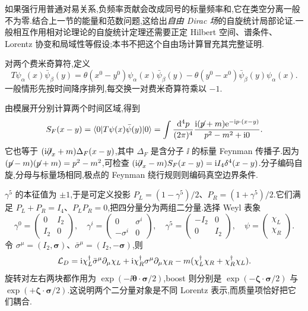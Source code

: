 如果强行用普通对易关系,负频率贡献会改成同号的标量频率和,它在类空分离一般不为零.结合上一节的能量和范数问题,这给出\emph{自由 Dirac 场}的自旋统计局部论证.一般相互作用相对论理论的自旋统计定理还需要正定 Hilbert 空间、谱条件、Lorentz 协变和局域性等假设;本书不把这个自由场计算冒充其完整证明.

\begin{definition}[费米时间排序]
对两个费米奇算符,定义
\begin{equation}
 T\psi_\alpha(x)\bar\psi_\beta(y)=
 \theta(x^0-y^0)\psi_\alpha(x)\bar\psi_\beta(y)
 -\theta(y^0-x^0)\bar\psi_\beta(y)\psi_\alpha(x).
\end{equation}
一般情形先按时间降序排列,每交换一对费米奇算符乘以 $-1$.
\end{definition}

由模展开分别计算两个时间区域,得到
\begin{equation}
 S_F(x-y)=\bra0T\psi(x)\bar\psi(y)\ket0
 =\intfourp\frac{\ii(\slashed p+m)\e^{-\ii p\cdot(x-y)}}{p^2-m^2+\ii0}.
 \label{eq:dirac-feynman}
\end{equation}
它也等于 $(\ii\slashed\partial_x+m)\Delta_F(x-y)$,其中 $\Delta_F$ 是含分子 $\ii$ 的标量 Feynman 传播子.因为 $(\slashed p-m)(\slashed p+m)=p^2-m^2$,可检查
$(\ii\slashed\partial_x-m)S_F(x-y)=\ii I_4\delta^4(x-y)$.分子编码自旋,分母与标量场相同,极点的 Feynman 绕行规则则编码真空边界条件.


$\gamma^5$ 的本征值为 $\pm1$,于是可定义投影 $P_L=(1-\gamma^5)/2$、$P_R=(1+\gamma^5)/2$.它们满足 $P_L+P_R=I_4$、$P_LP_R=0$,把四分量分为两组二分量.选择 Weyl 表象
\begin{equation}
 \gamma^0=\begin{pmatrix}0&I_2\\I_2&0\end{pmatrix},
 \quad \gamma^i=\begin{pmatrix}0&\sigma^i\\-\sigma^i&0\end{pmatrix},
 \quad \gamma^5=\begin{pmatrix}-I_2&0\\0&I_2\end{pmatrix},
 \quad \psi=\begin{pmatrix}\chi_L\\\chi_R\end{pmatrix}.
\end{equation}
令 $\sigma^\mu=(I_2,\boldsymbol\sigma)$、$\bar\sigma^\mu=(I_2,-\boldsymbol\sigma)$,则
\begin{equation}
 \Lag_D=\ii\chi_L^\dagger\bar\sigma^\mu\partial_\mu\chi_L
 +\ii\chi_R^\dagger\sigma^\mu\partial_\mu\chi_R
 -m(\chi_L^\dagger\chi_R+\chi_R^\dagger\chi_L).
 \label{eq:weyl-dirac-lagrangian}
\end{equation}
旋转对左右两块都作用为 $\exp(-\ii\boldsymbol\theta\cdot\boldsymbol\sigma/2)$,boost 则分别是 $\exp(-\boldsymbol\zeta\cdot\boldsymbol\sigma/2)$ 与 $\exp(+\boldsymbol\zeta\cdot\boldsymbol\sigma/2)$.这说明两个二分量对象是不同 Lorentz 表示,而质量项恰好把它们耦合.

